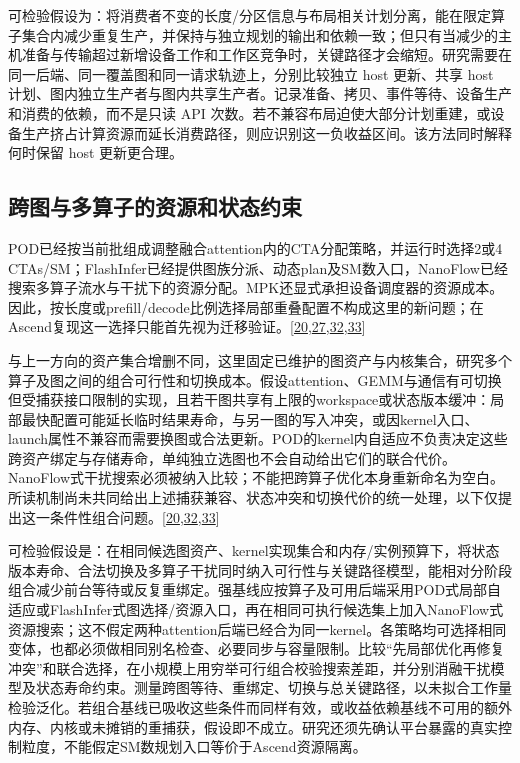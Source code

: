 \documentclass[
  UTF8,
  zihao=5]{ctexart}
\begin{document}
可检验假设为：将消费者不变的长度/分区信息与布局相关计划分离，能在限定算子集合内减少重复生产，并保持与独立规划的输出和依赖一致；但只有当减少的主机准备与传输超过新增设备工作和工作区竞争时，关键路径才会缩短。研究需要在同一后端、同一覆盖图和同一请求轨迹上，分别比较独立
host 更新、共享 host
计划、图内独立生产者与图内共享生产者。记录准备、拷贝、事件等待、设备生产和消费的依赖，而不是只读
API
次数。若不兼容布局迫使大部分计划重建，或设备生产挤占计算资源而延长消费路径，则应识别这一负收益区间。该方法同时解释何时保留
host 更新更合理。

\hypertarget{ux8de8ux56feux4e0eux591aux7b97ux5b50ux7684ux8d44ux6e90ux548cux72b6ux6001ux7ea6ux675f}{%
\subsection*{跨图与多算子的资源和状态约束}\label{ux8de8ux56feux4e0eux591aux7b97ux5b50ux7684ux8d44ux6e90ux548cux72b6ux6001ux7ea6ux675f}}

POD已经按当前批组成调整融合attention内的CTA分配策略，并运行时选择2或4
CTAs/SM；FlashInfer已经提供图族分派、动态plan及SM数入口，NanoFlow已经搜索多算子流水与干扰下的资源分配。MPK还显式承担设备调度器的资源成本。因此，按长度或prefill/decode比例选择局部重叠配置不构成这里的新问题；在Ascend复现这一选择只能首先视为迁移验证。{[}\protect\hyperlink{ref-ye2025flashinfer}{20},\protect\hyperlink{ref-cheng2026mpk}{27},\protect\hyperlink{ref-zhu2025nanoflow}{32},\protect\hyperlink{ref-kamath2025pod}{33}{]}

与上一方向的资产集合增删不同，这里固定已维护的图资产与内核集合，研究多个算子及图之间的组合可行性和切换成本。假设attention、GEMM与通信有可切换但受捕获接口限制的实现，且若干图共享有上限的workspace或状态版本缓冲：局部最快配置可能延长临时结果寿命，与另一图的写入冲突，或因kernel入口、launch属性不兼容而需要换图或合法更新。POD的kernel内自适应不负责决定这些跨资产绑定与存储寿命，单纯独立选图也不会自动给出它们的联合代价。NanoFlow式干扰搜索必须被纳入比较；不能把跨算子优化本身重新命名为空白。所读机制尚未共同给出上述捕获兼容、状态冲突和切换代价的统一处理，以下仅提出这一条件性组合问题。{[}\protect\hyperlink{ref-ye2025flashinfer}{20},\protect\hyperlink{ref-zhu2025nanoflow}{32},\protect\hyperlink{ref-kamath2025pod}{33}{]}

可检验假设是：在相同候选图资产、kernel实现集合和内存/实例预算下，将状态版本寿命、合法切换及多算子干扰同时纳入可行性与关键路径模型，能相对分阶段组合减少前台等待或反复重绑定。强基线应按算子及可用后端采用POD式局部自适应或FlashInfer式图选择/资源入口，再在相同可执行候选集上加入NanoFlow式资源搜索；这不假定两种attention后端已经合为同一kernel。各策略均可选择相同变体，也都必须做相同别名检查、必要同步与容量限制。比较``先局部优化再修复冲突''和联合选择，在小规模上用穷举可行组合校验搜索差距，并分别消融干扰模型及状态寿命约束。测量跨图等待、重绑定、切换与总关键路径，以未拟合工作量检验泛化。若组合基线已吸收这些条件而同样有效，或收益依赖基线不可用的额外内存、内核或未摊销的重捕获，假设即不成立。研究还须先确认平台暴露的真实控制粒度，不能假定SM数规划入口等价于Ascend资源隔离。
\end{document}

